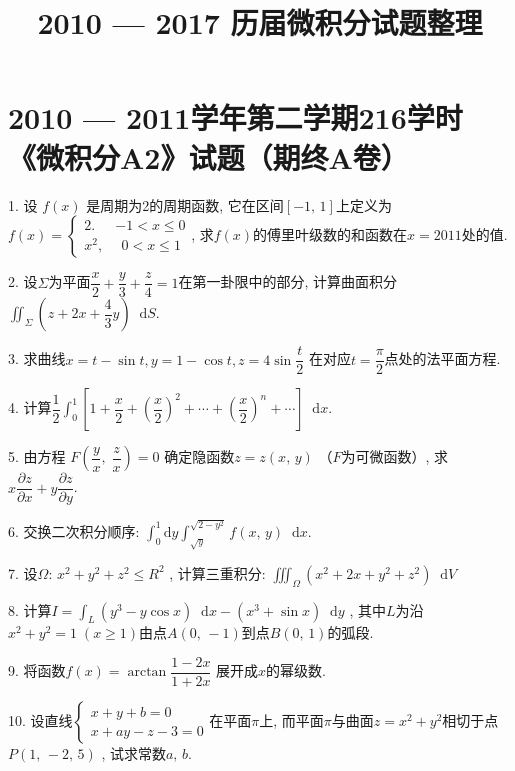 \documentclass{article}
\title{2010 --- 2017 历届微积分试题整理}
\date{}
\newcommand*{\dif}{\mathop{}\!\mathrm{d}}
\begin{document}
\section*{2010 --- 2011学年第二学期216学时《微积分A2》试题（期终A卷）}

1. 设 $f(x)$ 是周期为2的周期函数, 它在区间$[-1,\,1]$上定义为$f(x)=
\begin{cases}
2.  &-1<x\leqslant0 \\
x^2, &\ \ 0<x\leqslant1
\end{cases}
$\;,
求$f(x)$的傅里叶级数的和函数在$x=2011$处的值. \par

2. 设$\Sigma$为平面$\dfrac{x}{2}+\dfrac{y}{3}+\dfrac{z}{4}=1$在第一卦限中的部分, 
计算曲面积分$\displaystyle{ \iint_{\Sigma}{\left(z+2x+\dfrac{4}{3}y\right) \dif S} }$\;. \par

3. 求曲线$x=t-\sin t, y=1-\cos t, z=4\sin{\dfrac{t}{2}}$
在对应$t=\dfrac{\pi}{2}$点处的法平面方程. \par

4. 计算$\dfrac{1}{2} \displaystyle{\int_0^1{\left[1+\dfrac{x}{2} + \left(\dfrac{x}{2}\right)^2 + \cdots +
\left(\dfrac{x}{2}\right)^n + \cdots \right]\dif x}}$. \par

5. 由方程 $F\!\left(\dfrac{y}{x},\; \dfrac{z}{x}\right)=0$ 确定隐函数$z=z(x,\,y)$
（$F$为可微函数）, 求$x\dfrac{\partial z}{\partial x} + y\dfrac{\partial z}{\partial y}$. \par

6. 交换二次积分顺序: 
$\displaystyle\int_0^1\mathrm{d}y\displaystyle\int_{\sqrt{y}}^{\sqrt{2-y^2}}f(x,\,y)\dif x$\;. \par

7. 设$\Omega$: $x^2+y^2+z^2\leqslant R^2$ , 计算三重积分: 
$\displaystyle\iiint_{\Omega}{(x^2+2x+y^2+z^2)\dif V}$\par

8. 计算$I=\displaystyle\int_L{(y^3-y\cos x)\dif x - (x^3 + \sin x)\dif y}$ , 
其中$L$为沿$x^2+y^2=1\;(x\geqslant1)$由点$A(0,\,-1)$到点$B(0,\,1)$的弧段. \par

9. 将函数$f(x)=\arctan{\dfrac{1-2x}{1+2x}}$ 展开成$x$的幂级数. \par

10. 设直线$\begin{cases}x+y+b=0\\x+ay-z-3=0\end{cases}$在平面$\pi$上, 
而平面$\pi$与曲面$z=x^2+y^2$相切于点$P(1,\,-2,\,5)$ , 试求常数$a,\,b$. \par
\end{document}
